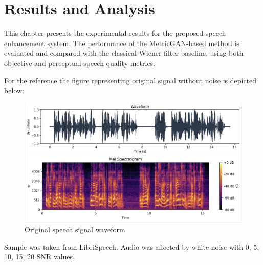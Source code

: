 \chapter{Results and Analysis}
This chapter presents the experimental results for the proposed speech enhancement system. The performance of the MetricGAN-based method is evaluated and compared with the classical Wiener filter baseline, using both objective and perceptual speech quality metrics.

For the reference the figure representing original signal without noise is depicted below:
\begin{figure}[H]
    \centering
    \includegraphics[width=.7\linewidth]{figures/original_.png}
     \caption{Original speech signal waveform}
    \label{fig:figure8}
\end{figure}



Sample was taken from LibriSpeech. Audio was affected by white noise with  0, 5, 10, 15, 20 SNR values. 


